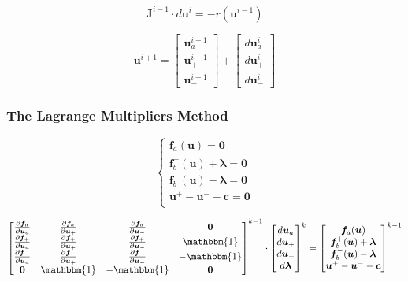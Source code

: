 \documentclass[3p]{elsarticle}
\begin{document}
\begin{equation}
\bm{J}^{i-1}\cdot d\bm{u}^{i}
=
-r(\bm{u}^{i-1})
\end{equation}


\begin{equation}
\bm{u}^{i+1} = 
\begin{bmatrix}\bm{u}_a^{i-1} \\ \bm{u}_+^{i-1} \\ \bm{u}_-^{i-1}\end{bmatrix} 
+ 
\begin{bmatrix} d\bm{u}_a^{i} \\ d\bm{u}_+^{i} \\ d\bm{u}_-^{i}\end{bmatrix}
\end{equation}

\subsubsection{The Lagrange Multipliers Method}

\begin{equation}
\left\{
\begin{array}{ll}
\bm{f}_a(\bm{u}) = \bm{0} \\
\bm{f}_b^+(\bm{u}) + \bm{\lambda} = \bm{0} \\
\bm{f}_b^-(\bm{u}) - \bm{\lambda} = \bm{0} \\
\bm{u}^+ - \bm{u}^- - \bm{c} = \bm{0}\\
\end{array}
\right.
\end{equation}

\begin{equation}
\begin{bmatrix}
\frac{\partial\bm{f}_a}{\partial\bm{u}_a} & \frac{\partial\bm{f}_a}{\partial\bm{u}_+} & \frac{\partial\bm{f}_a}{\partial\bm{u}_-} &  \bm{0}\\
\frac{\partial\bm{f}_+}{\partial\bm{u}_a} & \frac{\partial\bm{f}_+}{\partial\bm{u}_+} & \frac{\partial\bm{f}_+}{\partial\bm{u}_-} &  \mathbbm{1}\\
\frac{\partial\bm{f}_-}{\partial\bm{u}_a} & \frac{\partial\bm{f}_-}{\partial\bm{u}_+} & \frac{\partial\bm{f}_-}{\partial\bm{u}_-} & -\mathbbm{1}\\
\bm{0}                                    & \mathbbm{1}                               & -\mathbbm{1}                              &  \bm{0}\\
\end{bmatrix}^{k-1}
\cdot
\begin{bmatrix}
d\bm{u}_a \\
d\bm{u}_+ \\
d\bm{u}_- \\
d\bm{\lambda}
\end{bmatrix}^{k}
=
\begin{bmatrix}
\bm{f}_a(\bm{u}) \\
\bm{f}_b^+(\bm{u}) + \bm{\lambda} \\
\bm{f}_b^-(\bm{u}) - \bm{\lambda} \\
\bm{u}^{+} - \bm{u}^{-} - \bm{c}
\end{bmatrix}^{k-1}
\end{equation}
\end{document}
